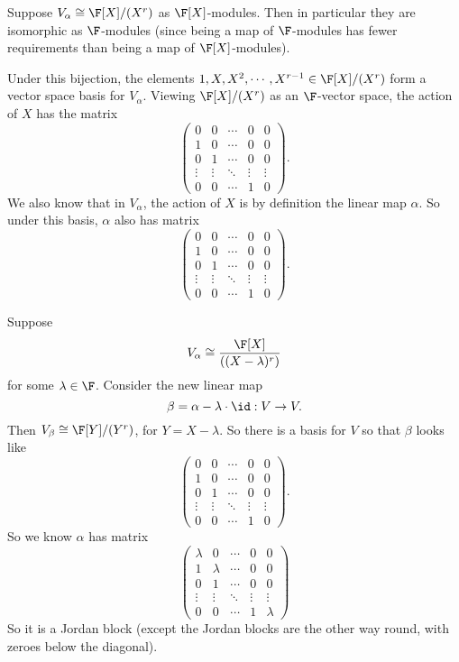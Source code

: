 \documentclass[a4paper]{article}
\begin{document}
\begin{eg}
  Suppose $V_\alpha \cong \F[X]/(X^r)$ as $\F[X]$-modules. Then in particular they are isomorphic as $\F$-modules (since being a map of $\F$-modules has fewer requirements than being a map of $\F[X]$-modules).

  Under this bijection, the elements $1, X, X^2, \cdots, X^{r - 1} \in \F[X]/(X^r)$ form a vector space basis for $V_\alpha$. Viewing $\F[X]/(X^r)$ as an $\F$-vector space, the action of $X$ has the matrix
  \[
    \begin{pmatrix}
      0 & 0 & \cdots & 0 & 0\\
      1 & 0 & \cdots & 0 & 0\\
      0 & 1 & \cdots & 0 & 0\\
      \vdots & \vdots & \ddots & \vdots & \vdots\\
      0 & 0 & \cdots & 1 & 0
    \end{pmatrix}.
  \]
  We also know that in $V_\alpha$, the action of $X$ is by definition the linear map $\alpha$. So under this basis, $\alpha$ also has matrix
  \[
    \begin{pmatrix}
      0 & 0 & \cdots & 0 & 0\\
      1 & 0 & \cdots & 0 & 0\\
      0 & 1 & \cdots & 0 & 0\\
      \vdots & \vdots & \ddots & \vdots & \vdots\\
      0 & 0 & \cdots & 1 & 0
    \end{pmatrix}.
  \]
\end{eg}

\begin{eg}
  Suppose
  \[
    V_\alpha \cong \frac{\F[X]}{((X - \lambda)^r)}
  \]
  for some $\lambda \in \F$. Consider the new linear map
  \[
    \beta = \alpha - \lambda \cdot \id: V \to V.
  \]
  Then $V_\beta \cong \F[Y]/(Y^r)$, for $Y = X - \lambda$. So there is a basis for $V$ so that $\beta$ looks like
  \[
    \begin{pmatrix}
      0 & 0 & \cdots & 0 & 0\\
      1 & 0 & \cdots & 0 & 0\\
      0 & 1 & \cdots & 0 & 0\\
      \vdots & \vdots & \ddots & \vdots & \vdots\\
      0 & 0 & \cdots & 1 & 0
    \end{pmatrix}.
  \]
  So we know $\alpha$ has matrix
  \[
    \begin{pmatrix}
      \lambda & 0 & \cdots & 0 & 0\\
      1 & \lambda & \cdots & 0 & 0\\
      0 & 1 & \cdots & 0 & 0\\
      \vdots & \vdots & \ddots & \vdots & \vdots\\
      0 & 0 & \cdots & 1 & \lambda
    \end{pmatrix}
  \]
  So it is a Jordan block (except the Jordan blocks are the other way round, with zeroes below the diagonal).
\end{eg}
\end{document}
